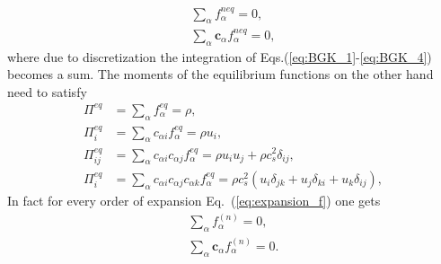 \begin{align}\label{eq:non_constraint}
    \sum_{\alpha} f_{\alpha}^{neq} = 0, \\
    \sum_{\alpha} \mathbf{c}_{\alpha}f_{\alpha}^{neq} = 0, 
\end{align}
where due to discretization the integration of Eqs.(\ref{eq:BGK_1}-\ref{eq:BGK_4}) becomes a sum.
The moments of the equilibrium functions on the other hand need to satisfy~\cite{chen1998lattice} 
\begin{align}
    \Pi^{eq} &= \sum_{\alpha} f_{\alpha}^{eq} = \rho, \label{eq:moments_equilibria_1}\\
    \Pi^{eq}_i &= \sum_{\alpha} c_{\alpha i}f_{\alpha}^{eq} = \rho u_i, \label{eq:moments_equilibria_2}\\
    \Pi^{eq}_{i j} &= \sum_{\alpha} c_{\alpha i} c_{\alpha j}f_{\alpha}^{eq} = \rho u_i u_j + \rho c_s^2\delta_{i j}, \label{eq:moments_equilibria_3}\\
    \Pi^{eq}_i &= \sum_{\alpha} c_{\alpha i} c_{\alpha j} c_{\alpha k}f_{\alpha}^{eq} = \rho c_s^2(u_i\delta_{j k} + u_j\delta_{k i} + u_k\delta_{i j}), \label{eq:moments_equilibria_4}
\end{align}
In fact for every order of expansion Eq.~(\ref{eq:expansion_f}) one gets
\begin{align}\label{eq:all_order_constraint}
    \sum_{\alpha} f_{\alpha}^{(n)} = 0, \\
    \sum_{\alpha} \mathbf{c}_{\alpha}f_{\alpha}^{(n)} = 0. 
\end{align}


